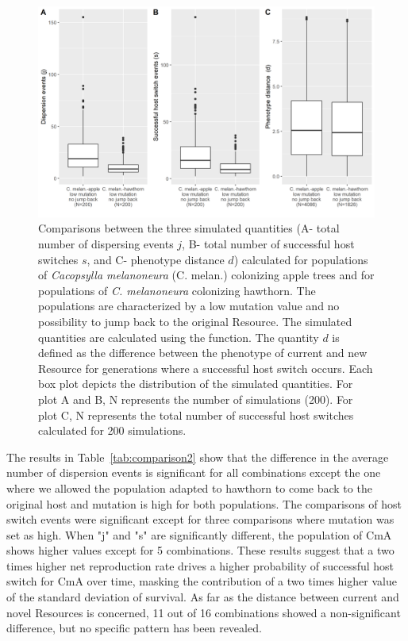 \begin{figure}[htbp]
  \centering
  \includegraphics[width=120mm,scale=0.7]{figure 2usage.png}
  \caption{Comparisons between the three simulated quantities (A- total number of dispersing events $j$, B- total number of successful host switches $s$, and C- phenotype distance $d$) calculated for populations of \textit{Cacopsylla melanoneura} (C. melan.) colonizing apple trees and for populations of \textit{C. melanoneura} colonizing hawthorn. The populations are characterized by a low mutation value and no possibility to jump back to the original Resource. The simulated quantities are calculated using the  function. The quantity $d$ is defined as the difference between the phenotype of current and new Resource for generations where a successful host switch occurs. Each box plot depicts the distribution of the simulated quantities. For plot A and B, N represents the number of simulations (200). For plot C, N represents the total number of successful host switches calculated for 200 simulations.}
  \label{figure:Boxplots2}
\end{figure}

The results in Table~\ref{tab:comparison2} show that the difference in the average number of dispersion events is significant for all combinations except the one where we allowed the population adapted to hawthorn to come back to the original host and mutation is high for both populations.
The comparisons of host switch events were significant except for three comparisons where mutation was set as high. When "j" and "s" are significantly different, the population of CmA shows higher values except for 5 combinations. These results suggest that a two times higher net reproduction rate drives a higher probability of successful host switch for CmA over time, masking the contribution of a two times higher value of the standard deviation of survival.
As far as the distance between current and novel Resources is concerned, 11 out of 16 combinations showed a non-significant difference, but no specific pattern has been revealed.

